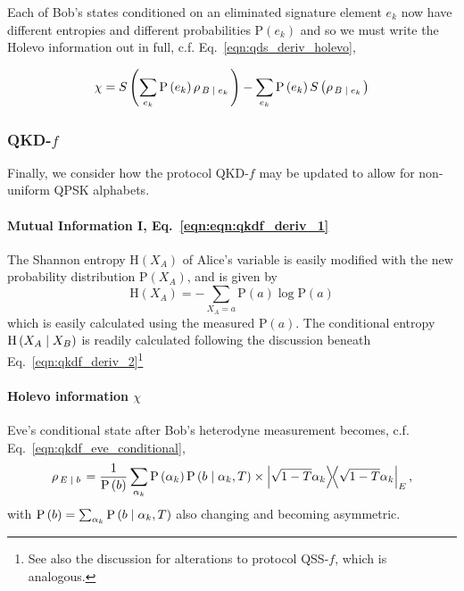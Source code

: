 Each of Bob's states conditioned on an eliminated signature element $e_k$ now have different entropies and different probabilities $\text{P}\left(e_k\right)$ and so we must write the Holevo information out in full, c.f. Eq.~\ref{eqn:qds_deriv_holevo},

\begin{equation}
\chi = S\left(\sum_{e_k} \text{P}\left(e_k\right) \rho_{\left.B\; \middle| \; e_k\right.}\right) - \sum_{e_k} \text{P}\left(e_k\right) S\left(\rho_{\left.B\; \middle| \; e_k\right.}\right)
\end{equation}

\subsubsection{QKD-$f$}



Finally, we consider how the protocol QKD-$f$ may be updated to allow for non-uniform QPSK alphabets.

\paragraph{Mutual Information I, Eq.~\ref{eqn:eqn:qkdf_deriv_1}}

The Shannon entropy $\text{H}\left(X_A\right)$ of Alice's variable is easily modified with the new probability distribution $\text{P}\left(X_A\right)$, and is given by
\begin{equation}
\text{H}\left(X_A\right) = - \sum_{X_A=a} \text{P}\left(a\right) \log \text{P}\left(a\right)
\end{equation}
which is easily calculated using the measured $\text{P}\left(a\right)$. The conditional entropy $\text{H}\left(X_A \; \middle| \; X_B\right)$ is readily calculated following the discussion beneath Eq.~\ref{eqn:qkdf_deriv_2}\footnote{See also the discussion for alterations to protocol QSS-$f$, which is analogous.}

\paragraph{Holevo information $\chi$}
Eve's conditional state after Bob's heterodyne measurement becomes, c.f. Eq.~\ref{eqn:qkdf_eve_conditional},
\begin{equation}\label{eqn:qkdf_eve_conditional_modified}
\rho_{\left. E \given b\right.} = \frac{1}{\text{P}\left(b\right)} \sum_{\alpha_k} \text{P}\left(\alpha_k\right) \text{P}\left(b \given \alpha_k, T\right) \times \dyad{\sqrt{1-T}\alpha_k}_E,
\end{equation}
with $\text{P}\left(b\right) = \sum_{\alpha_k} \text{P}\left(b \; \middle| \; \alpha_k, T\right)$ also changing and becoming asymmetric. 

